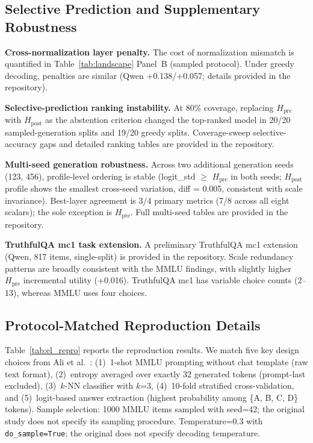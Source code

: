 \documentclass{ieeeaccess}
\newcommand{\Hpre}{H_{\text{pre}}}
\newcommand{\Hpost}{H_{\text{post}}}
\begin{document}
\subsection{Selective Prediction and Supplementary Robustness}
\label{app:ranking}
\label{app:multiseed}
\label{app:truthfulqa}

\textbf{Cross-normalization layer penalty.} The cost of normalization mismatch is quantified in Table~\ref{tab:landscape} Panel~B (sampled protocol). Under greedy decoding, penalties are similar (Qwen +0.138/$+$0.057; details provided in the repository).

\textbf{Selective-prediction ranking instability.} At 80\% coverage, replacing $\Hpre$ with $\Hpost$ as the abstention criterion changed the top-ranked model in 20/20 sampled-generation splits and 19/20 greedy splits. Coverage-sweep selective-accuracy gaps and detailed ranking tables are provided in the repository.

\textbf{Multi-seed generation robustness.} Across two additional generation seeds (123, 456), profile-level ordering is stable (logit\_std $\geq$ $\Hpre$ in both seeds; $\Hpost$ profile shows the smallest cross-seed variation, diff = 0.005, consistent with scale invariance). Best-layer agreement is 3/4 primary metrics (7/8 across all eight scalars); the sole exception is $\Hpre$. Full multi-seed tables are provided in the repository.

\textbf{TruthfulQA mc1 task extension.} A preliminary TruthfulQA mc1 extension (Qwen, 817 items, single-split) is provided in the repository. Scale redundancy patterns are broadly consistent with the MMLU findings, with slightly higher $\Hpre$ incremental utility (+0.016). TruthfulQA mc1 has variable choice counts (2--13), whereas MMLU uses four choices.

\subsection{Protocol-Matched Reproduction Details}
\label{app:reproduction}

Table~\ref{tab:el_repro} reports the reproduction results. We match five key design choices from Ali et al.\ \cite{ali2025entropylens}: (1)~1-shot MMLU prompting without chat template (raw text format), (2)~entropy averaged over exactly 32 generated tokens (prompt-last excluded), (3)~$k$-NN classifier with $k$=3, (4)~10-fold stratified cross-validation, and (5)~logit-based answer extraction (highest probability among \{A, B, C, D\} tokens). Sample selection: 1000 MMLU items sampled with seed=42; the original study does not specify its sampling procedure. Temperature=0.3 with \texttt{do\_sample=True}; the original does not specify decoding temperature.
\end{document}
